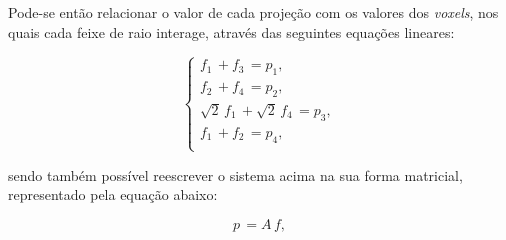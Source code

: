 Pode-se então relacionar o valor de cada projeção com os valores dos \textit{voxels}, nos quais cada feixe de raio interage, através das seguintes equações lineares:

\begin{equation}
\begin{cases}
f_{1} \, + f_{3} \, = p_{1}, \\ 
f_{2} \, + f_{4} \, = p_{2}, \\ 
\sqrt{2} \, f_{1} \, + \sqrt{2} \, f_{4} \, = p_{3}, \\ 
f_{1} \, + f_{2} \, = p_{4}, \\ 
\end{cases}
\label{eq:eqCap3EquacoesLineares}
\end{equation} 

\noindent sendo também possível reescrever o sistema acima na sua forma matricial, representado pela equação abaixo:

\begin{equation}
p \, = A \, f,
\label{eq:eqCap3MatrizEquacoesLineares1}
\end{equation}

